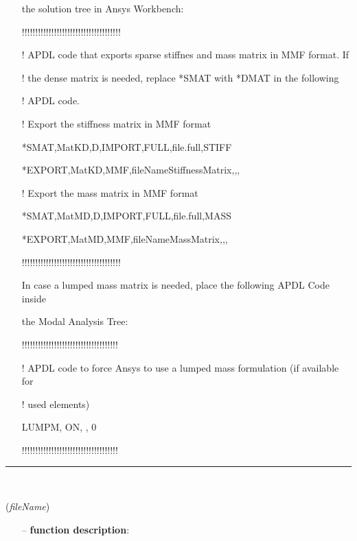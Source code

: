 \begin{itemize}[leftmargin=1.4cm]
\begin{itemize}[leftmargin=1.4cm]
\begin{itemize}[leftmargin=0.5cm]
\begin{itemize}[leftmargin=1.4cm]
\begin{itemize}[leftmargin=1.4cm]
\begin{itemize}[leftmargin=0.5cm]
\begin{itemize}[leftmargin=0.7cm]
\begin{itemize}[leftmargin=1.2cm]
\item[]the solution tree in Ansys Workbench:
\item[]!!!!!!!!!!!!!!!!!!!!!!!!!!!!!!!!!!!!!
\item[]! APDL code that exports sparse stiffnes and mass matrix in MMF format. If
\item[]! the dense matrix is needed, replace *SMAT with *DMAT in the following
\item[]! APDL code.
\item[]! Export the stiffness matrix in MMF format
\item[]*SMAT,MatKD,D,IMPORT,FULL,file.full,STIFF
\item[]*EXPORT,MatKD,MMF,fileNameStiffnessMatrix,,,
\item[]! Export the mass matrix in MMF format
\item[]*SMAT,MatMD,D,IMPORT,FULL,file.full,MASS
\item[]*EXPORT,MatMD,MMF,fileNameMassMatrix,,,
\item[]!!!!!!!!!!!!!!!!!!!!!!!!!!!!!!!!!!!!!
\item[]In case a lumped mass matrix is needed, place the following APDL Code inside
\item[]the Modal Analysis Tree:
\item[]!!!!!!!!!!!!!!!!!!!!!!!!!!!!!!!!!!!!
\item[]! APDL code to force Ansys to use a lumped mass formulation (if available for
\item[]! used elements)
\item[]LUMPM, ON, , 0
\item[]!!!!!!!!!!!!!!!!!!!!!!!!!!!!!!!!!!!!
\end{itemize}
\vspace{12pt}\end{itemize}
%
\noindent\rule{8cm}{0.75pt}\vspace{1pt} \\ 
\begin{flushleft}
\label{sec:FEM:ReadMatrixDOFmappingVectorFromAnsysTxt}
({\it fileName})
\end{flushleft}
\setlength{\itemindent}{0.7cm}
\begin{itemize}[leftmargin=0.7cm]
\item[--]
{\bf function description}: \vspace{-6pt}
\begin{itemize}[leftmargin=1.2cm]

\end{itemize}
\end{itemize}
\end{itemize}
\end{itemize}
\end{itemize}
\end{itemize}
\end{itemize}
\end{itemize}
